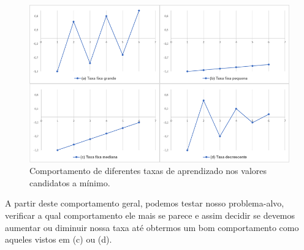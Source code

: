 \begin{figure}[htb]
\centering
\includegraphics[width=14cm]{figuras/grad_4}
\caption{Comportamento de diferentes taxas de aprendizado nos valores candidatos a mínimo.}
\label{fig:grad_4}
\end{figure}

A partir deste comportamento geral, podemos testar nosso problema-alvo, verificar a qual comportamento ele mais se parece e assim decidir se devemos aumentar ou diminuir nossa taxa até obtermos um bom comportamento como aqueles vistos em (c) ou (d).